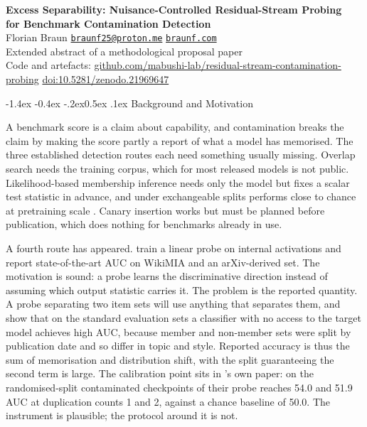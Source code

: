 \documentclass[10pt,letterpaper]{article}
\makeatletter
\renewcommand\section{\@startsection{section}{1}{\z@}%
  {-1.4ex \@plus -0.4ex \@minus -.2ex}{0.5ex \@plus .1ex}%
  {\normalfont\normalsize\bfseries}}
\makeatother
\begin{document}
\begin{center}
{\large\bfseries Excess Separability: Nuisance-Controlled Residual-Stream Probing\\[1pt]
for Benchmark Contamination Detection}\\[4pt]
{\normalsize Florian Braun}\quad
{\small\texttt{\href{mailto:braunf25@proton.me}{braunf25@proton.me}}}\quad
{\small\texttt{\href{https://braunf.com/}{braunf.com}}}\\[2pt]
{\small Extended abstract of a methodological proposal paper}\\[3pt]
{\footnotesize Code and artefacts:
\href{https://github.com/mabushi-lab/residual-stream-contamination-probing}%
{github.com/mabushi-lab/residual-stream-contamination-probing}\quad
\href{https://doi.org/10.5281/zenodo.21969647}{doi:10.5281/zenodo.21969647}}
\end{center}

\vspace{0pt}

\section{Background and Motivation}

A benchmark score is a claim about capability, and contamination breaks the claim by making the score partly a report of what a model has memorised. The three established detection routes each need something usually missing. Overlap search needs the training corpus, which for most released models is not public. Likelihood-based membership inference needs only the model but fixes a scalar test statistic in advance, and under exchangeable splits performs close to chance at pretraining scale \cite{duan2024mia}. Canary insertion works but must be planned before publication, which does nothing for benchmarks already in use.

A fourth route has appeared. \citet{liu2024probing} train a linear probe on internal activations and report state-of-the-art AUC on WikiMIA and an arXiv-derived set. The motivation is sound: a probe learns the discriminative direction instead of assuming which output statistic carries it. The problem is the reported quantity. A probe separating two item sets will use anything that separates them, and \citet{das2024blind} show that on the standard evaluation sets a classifier with no access to the target model achieves high AUC, because member and non-member sets were split by publication date and so differ in topic and style. Reported accuracy is thus the sum of memorisation and distribution shift, with the split guaranteeing the second term is large. The calibration point sits in \citeauthor{liu2024probing}'s own paper: on the randomised-split contaminated checkpoints of \citet{oren2024proving} their probe reaches 54.0 and 51.9 AUC at duplication counts 1 and 2, against a chance baseline of 50.0. The instrument is plausible; the protocol around it is not.
\end{document}
